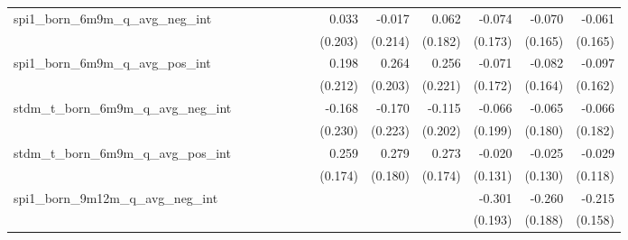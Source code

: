 \begin{tabular}{lrrrrrrrrrrrr}
spi1\_born\_6m9m\_q\_avg\_neg\_int          &              &              &              &              &              &              &        0.033 &       -0.017 &        0.062 &       -0.074 &       -0.070 &       -0.061 \\ 
                                            &              &              &              &              &              &              &      (0.203) &      (0.214) &      (0.182) &      (0.173) &      (0.165) &      (0.165) \\ 
spi1\_born\_6m9m\_q\_avg\_pos\_int          &              &              &              &              &              &              &        0.198 &        0.264 &        0.256 &       -0.071 &       -0.082 &       -0.097 \\ 
                                            &              &              &              &              &              &              &      (0.212) &      (0.203) &      (0.221) &      (0.172) &      (0.164) &      (0.162) \\ 
stdm\_t\_born\_6m9m\_q\_avg\_neg\_int       &              &              &              &              &              &              &       -0.168 &       -0.170 &       -0.115 &       -0.066 &       -0.065 &       -0.066 \\ 
                                            &              &              &              &              &              &              &      (0.230) &      (0.223) &      (0.202) &      (0.199) &      (0.180) &      (0.182) \\ 
stdm\_t\_born\_6m9m\_q\_avg\_pos\_int       &              &              &              &              &              &              &        0.259 &        0.279 &        0.273 &       -0.020 &       -0.025 &       -0.029 \\ 
                                            &              &              &              &              &              &              &      (0.174) &      (0.180) &      (0.174) &      (0.131) &      (0.130) &      (0.118) \\ 
spi1\_born\_9m12m\_q\_avg\_neg\_int         &              &              &              &              &              &              &              &              &              &       -0.301 &       -0.260 &       -0.215 \\ 
                                            &              &              &              &              &              &              &              &              &              &      (0.193) &      (0.188) &      (0.158) \\ 

\end{tabular}
